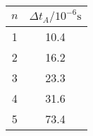 \label{tab:tabAuge}
	\begin{tabular}{S[table-format=1.0]S[table-format=2.1]}
		\toprule
		{$n$} & {$\Delta t_A/10^{-6}\si{\second}$} \\
		 & 10.4 \\
		2 & 16.2 \\
		3 & 23.3 \\
		4 & 31.6 \\
		5 & 73.4 \\
		\bottomrule
	\end{tabular}
